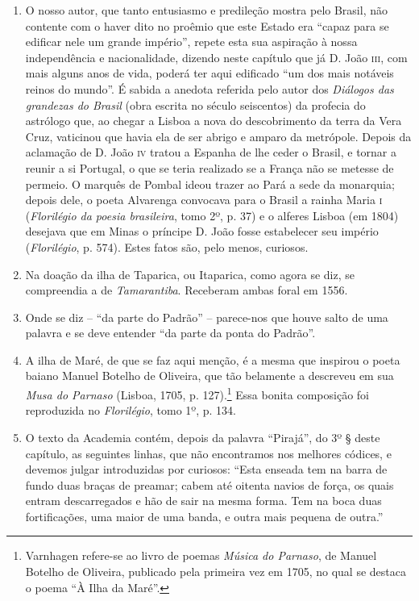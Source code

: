 \begin{enumerate}
\item O nosso autor, que tanto entusiasmo e predileção mostra pelo Brasil, não contente 
com o haver dito no proêmio que este Estado era ``capaz para se edificar nele um 
grande império'', repete esta sua aspiração à nossa independência e nacionalidade, 
dizendo neste capítulo que já D. João \textsc{iii}, com mais alguns anos de vida, poderá ter aqui 
edificado ``um dos mais notáveis reinos do mundo''. 
É sabida a anedota referida pelo autor dos \textit{Diálogos das grandezas do Brasil} (obra 
escrita no século seiscentos) da profecia do astrólogo que, ao chegar a Lisboa a nova do 
descobrimento da terra da Vera Cruz, vaticinou que havia ela de 
ser abrigo e amparo da metrópole. Depois da aclamação de D. João \textsc{iv} tratou a Espanha de 
lhe ceder o Brasil, e tornar a reunir a si Portugal, o que se teria realizado se a França não se 
metesse de permeio. O marquês de Pombal ideou trazer ao Pará a sede da monarquia; depois 
dele, o poeta Alvarenga convocava para o Brasil a rainha Maria \textsc{i} (\textit{Florilégio da poesia brasileira}, 
tomo 2º, p. 37) e o alferes Lisboa (em 1804) desejava que em Minas o príncipe 
D. João fosse estabelecer seu império (\textit{Florilégio}, p. 574). Estes fatos são, pelo menos, 
curiosos.

\item Na doação da ilha de Taparica, ou Itaparica, como agora se diz, se compreendia a 
de \textit{Tamarantiba}. Receberam ambas foral em 1556.

\item Onde se diz -- ``da parte do Padrão'' -- parece-nos que houve salto de uma palavra e 
se deve entender ``da parte da ponta do Padrão''. 

\item A ilha de Maré, de que se faz aqui menção, é a mesma que inspirou o poeta baiano 
Manuel Botelho de Oliveira, que tão belamente a descreveu em sua \textit{Musa do Parnaso} 
(Lisboa, 1705, p. 127).\footnote{ Varnhagen refere-se ao livro de poemas \textit{Música do Parnaso}, de Manuel Botelho de Oliveira, 
publicado pela primeira vez em 1705, no qual se destaca o poema ``À Ilha da Maré''.} 
Essa bonita composição foi reproduzida  no  \textit{Florilégio}, tomo 1º, p. 134.

\item O texto da Academia contém, depois da palavra ``Pirajá'', do 3º § deste capítulo, as 
seguintes linhas, que não encontramos nos melhores códices, e devemos julgar 
introduzidas por curiosos: ``Esta enseada tem na barra de fundo duas braças de preamar; 
cabem até oitenta navios de força, os quais entram descarregados e hão de sair na mesma 
forma. Tem na boca duas fortificações, uma maior de uma banda, e outra mais 
pequena de outra.''


\end{enumerate}
